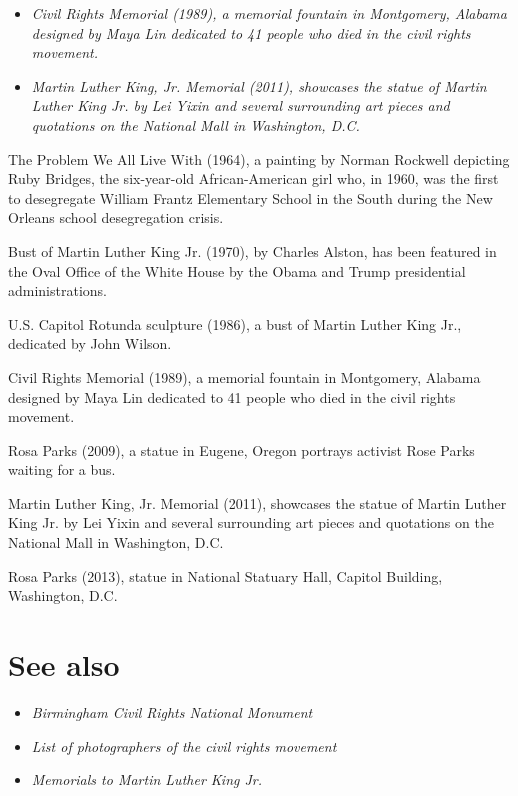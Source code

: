 \begin{itemize}
\item
  \emph{Civil Rights Memorial (1989), a memorial fountain in Montgomery,
  Alabama designed by Maya Lin dedicated to 41 people who died in the
  civil rights movement.}
\item
  \emph{Martin Luther King, Jr. Memorial (2011), showcases the statue of
  Martin Luther King Jr. by Lei Yixin and several surrounding art pieces
  and quotations on the National Mall in Washington, D.C.}
\end{itemize}

The Problem We All Live With (1964), a painting by Norman Rockwell
depicting Ruby Bridges, the six-year-old African-American girl who, in
1960, was the first to desegregate William Frantz Elementary School in
the South during the New Orleans school desegregation crisis.

Bust of Martin Luther King Jr. (1970), by Charles Alston, has been
featured in the Oval Office of the White House by the Obama and Trump
presidential administrations.

U.S. Capitol Rotunda sculpture (1986), a bust of Martin Luther King Jr.,
dedicated by John Wilson.

Civil Rights Memorial (1989), a memorial fountain in Montgomery, Alabama
designed by Maya Lin dedicated to 41 people who died in the civil rights
movement.

Rosa Parks (2009), a statue in Eugene, Oregon portrays activist Rose
Parks waiting for a bus.

Martin Luther King, Jr. Memorial (2011), showcases the statue of Martin
Luther King Jr. by Lei Yixin and several surrounding art pieces and
quotations on the National Mall in Washington, D.C.

Rosa Parks (2013), statue in National Statuary Hall, Capitol Building,
Washington, D.C.

\section{See also}\label{see-also}

\begin{itemize}
\item
  \emph{Birmingham Civil Rights National Monument}
\item
  \emph{List of photographers of the civil rights movement}
\item
  \emph{Memorials to Martin Luther King Jr.}
\end{itemize}

